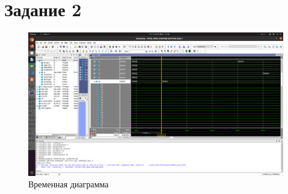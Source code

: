 \section{Задание 2}

\begin{figure}[ht!]
    \centering
    \includegraphics[width=170mm]{./img/task_2.png}
    \caption{Временная диаграмма \label{overflow}}
\end{figure}